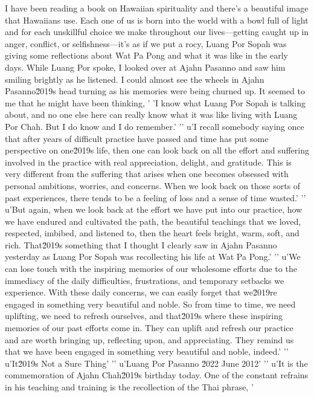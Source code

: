I have been reading a book on Hawaiian spirituality and there's a 
beautiful image that Hawaiians use. Each one of us is born into the 
world with a bowl full of light and for each unskillful choice we make 
throughout our lives---getting caught up in anger, conflict, or 
selfishness---it's as if we put a rocy, Luang Por Sopah was giving some reflections about Wat Pa Pong and what it was like in the early days. While Luang Por spoke, I looked over at Ajahn Pasanno and saw him smiling brightly as he listened. I could almost see the wheels in Ajahn Pasanno\u2019s head turning as his memories were being churned up. It seemed to me that he might have been thinking, '
'I know what Luang Por Sopah is talking about, and no one else here can really know what it was like living with Luang Por Chah. But I do know and I do remember.'
'\n'
u'I recall somebody saying once that after years of difficult practice have passed and time has put some perspective on one\u2019s life, then one can look back on all the effort and suffering involved in the practice with real appreciation, delight, and gratitude. This is very different from the suffering that arises when one becomes obsessed with personal ambitions, worries, and concerns. When we look back on those sorts of past experiences, there tends to be a feeling of loss and a sense of time wasted.'
'\n'
u'But again, when we look back at the effort we have put into our practice, how we have endured and cultivated the path, the beautiful teachings that we loved, respected, imbibed, and listened to, then the heart feels bright, warm, soft, and rich. That\u2019s something that I thought I clearly saw in Ajahn Pasanno yesterday as Luang Por Sopah was recollecting his life at Wat Pa Pong.'
'\n'
u'We can lose touch with the inspiring memories of our wholesome efforts due to the immediacy of the daily difficulties, frustrations, and temporary setbacks we experience. With these daily concerns, we can easily forget that we\u2019re engaged in something very beautiful and noble. So from time to time, we need uplifting, we need to refresh ourselves, and that\u2019s where these inspiring memories of our past efforts come in. They can uplift and refresh our practice and are worth bringing up, reflecting upon, and appreciating. They remind us that we have been engaged in something very beautiful and noble, indeed.'
'\n'
u'It\u2019s Not a Sure Thing'
'\n'
u'Luang Por Pasanno \u2022 June 2012'
'\n'
u'It is the commemoration of Ajahn Chah\u2019s birthday today. One of the constant refrains in his teaching and training is the recollection of the Thai phrase, '
